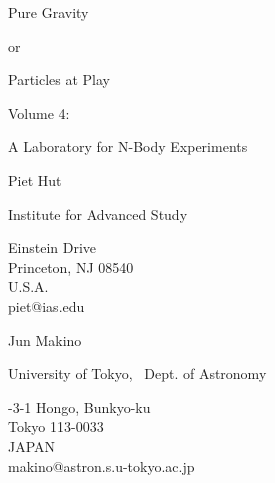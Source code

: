 
\thispagestyle{empty}                 %

\bigskip\bigskip\bigskip\bigskip\bigskip\bigskip
\begin{center}

{\lggggb Pure Gravity}

\medskip

{\lgb or}

\medskip

{\lggb Particles at Play}

\bigskip\bigskip\bigskip\bigskip\bigskip

{\lgb Volume 4:}

\bigskip

{\lggb A Laboratory for N-Body Experiments}

\bigskip\bigskip\bigskip\bigskip\bigskip

{\lggr Piet Hut}

{\lgr Institute for Advanced Study}

{ Einstein Drive}\\
{\lr Princeton, NJ 08540}\\
{\lr U.S.A.}\\
{\lr piet@ias.edu}

\bigskip

{\lggr Jun Makino}

{\lgr University of Tokyo, \ Dept. of Astronomy}

{-3-1 Hongo, Bunkyo-ku}\\
{\lr Tokyo 113-0033}\\
{\lr JAPAN}\\
{\lr makino@astron.s.u-tokyo.ac.jp}

\end{center}
